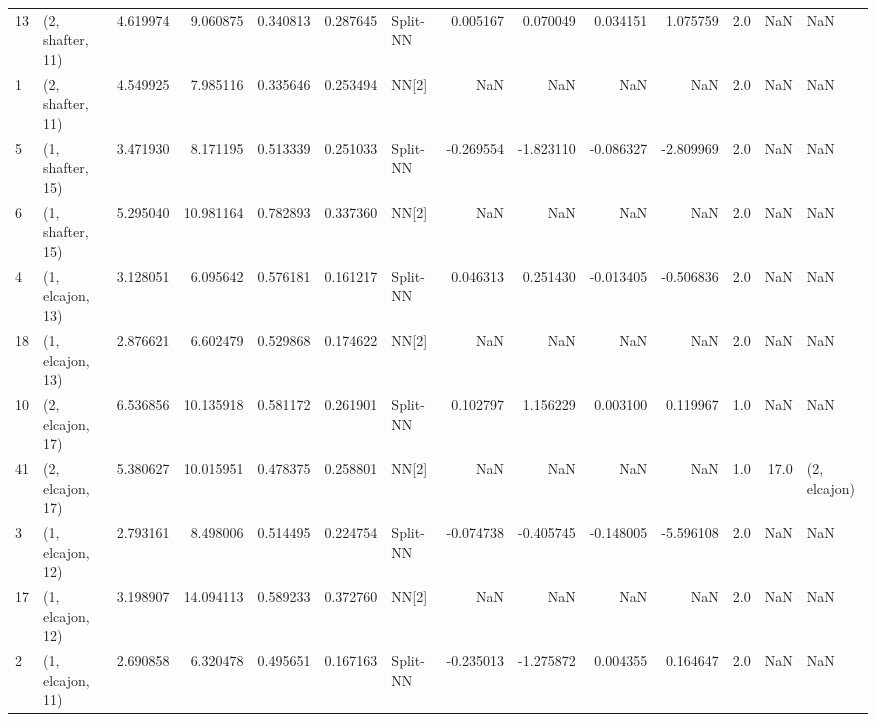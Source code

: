 \begin{tabular}{llrrrrlrrrrrrl}
13 &  (2, shafter, 11) &  4.619974 &   9.060875 &   0.340813 &  0.287645 &    Split-NN &        0.005167 &      0.070049 &       0.034151 &     1.075759 &            2.0 &    NaN &              NaN \\
1  &  (2, shafter, 11) &  4.549925 &   7.985116 &   0.335646 &  0.253494 &       NN[2] &             NaN &           NaN &            NaN &          NaN &            2.0 &    NaN &              NaN \\
5  &  (1, shafter, 15) &  3.471930 &   8.171195 &   0.513339 &  0.251033 &    Split-NN &       -0.269554 &     -1.823110 &      -0.086327 &    -2.809969 &            2.0 &    NaN &              NaN \\
6  &  (1, shafter, 15) &  5.295040 &  10.981164 &   0.782893 &  0.337360 &       NN[2] &             NaN &           NaN &            NaN &          NaN &            2.0 &    NaN &              NaN \\
4  &  (1, elcajon, 13) &  3.128051 &   6.095642 &   0.576181 &  0.161217 &    Split-NN &        0.046313 &      0.251430 &      -0.013405 &    -0.506836 &            2.0 &    NaN &              NaN \\
18 &  (1, elcajon, 13) &  2.876621 &   6.602479 &   0.529868 &  0.174622 &       NN[2] &             NaN &           NaN &            NaN &          NaN &            2.0 &    NaN &              NaN \\
10 &  (2, elcajon, 17) &  6.536856 &  10.135918 &   0.581172 &  0.261901 &    Split-NN &        0.102797 &      1.156229 &       0.003100 &     0.119967 &            1.0 &    NaN &              NaN \\
41 &  (2, elcajon, 17) &  5.380627 &  10.015951 &   0.478375 &  0.258801 &       NN[2] &             NaN &           NaN &            NaN &          NaN &            1.0 &   17.0 &     (2, elcajon) \\
3  &  (1, elcajon, 12) &  2.793161 &   8.498006 &   0.514495 &  0.224754 &    Split-NN &       -0.074738 &     -0.405745 &      -0.148005 &    -5.596108 &            2.0 &    NaN &              NaN \\
17 &  (1, elcajon, 12) &  3.198907 &  14.094113 &   0.589233 &  0.372760 &       NN[2] &             NaN &           NaN &            NaN &          NaN &            2.0 &    NaN &              NaN \\
2  &  (1, elcajon, 11) &  2.690858 &   6.320478 &   0.495651 &  0.167163 &    Split-NN &       -0.235013 &     -1.275872 &       0.004355 &     0.164647 &            2.0 &    NaN &              NaN \\

\end{tabular}
